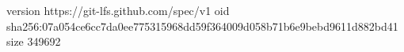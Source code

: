 version https://git-lfs.github.com/spec/v1
oid sha256:07a054ce6cc7da0ee775315968dd59f364009d058b71b6e9bebd9611d882bd41
size 349692
